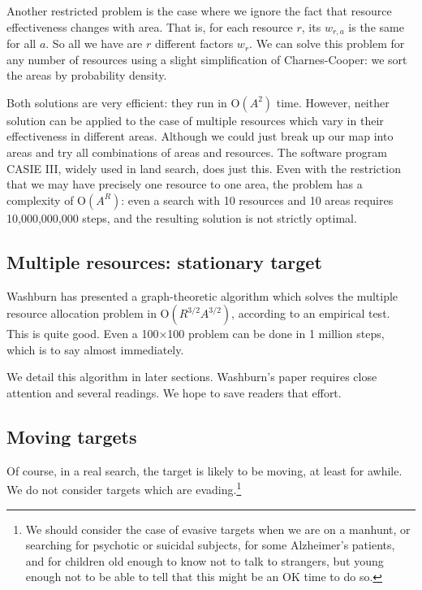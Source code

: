 Another restricted problem is the case where we ignore the fact that
resource effectiveness changes with area. That is, for each
resource $r$, its $w_{r,a}$ is the same for all $a$. So all we have
are $r$ different factors $w_r$. We can solve this problem for any
number of resources using a slight simplification of Charnes-Cooper:
we sort the areas by probability density.

Both solutions are very efficient: they run in O$(A^2)$ time. However,
neither solution can be applied to the case of multiple resources
which vary in their effectiveness in different areas. Although we
could just break up our map into areas and try all combinations of
areas and resources. The software program CASIE III, widely used in
land search, does just this. Even with the restriction that we may
have precisely one resource to one area, the problem has a complexity
of O$(A^R)$: even a search with 10 resources and 10 areas requires
10,000,000,000 steps, and the resulting solution is not strictly
optimal.


\subsection{Multiple resources: stationary target}
\label{sec:mult}

Washburn \cite{washburn95:_jota} has presented a graph-theoretic
algorithm which solves the multiple resource allocation
problem in O$(R^{3/2}A^{3/2})$, according to an empirical test. This
is quite good. Even a 100$\times$100 problem can be done in 1 million
steps, which is to say almost immediately.

We detail this algorithm in later sections. Washburn's paper requires
close attention and several readings. We hope to save readers that
effort. 

\subsection{Moving targets}
\label{sec:moving}

Of course, in a real search, the target is likely to be moving, at
least for awhile. We do not consider targets which are
evading.\footnote{We should consider the case of evasive targets when
  we are on a manhunt, or searching for psychotic or suicidal
  subjects, for some Alzheimer's patients, and for children old enough
  to know not to talk to strangers, but young enough not to be able to
  tell that this might be an OK time to do so.}

